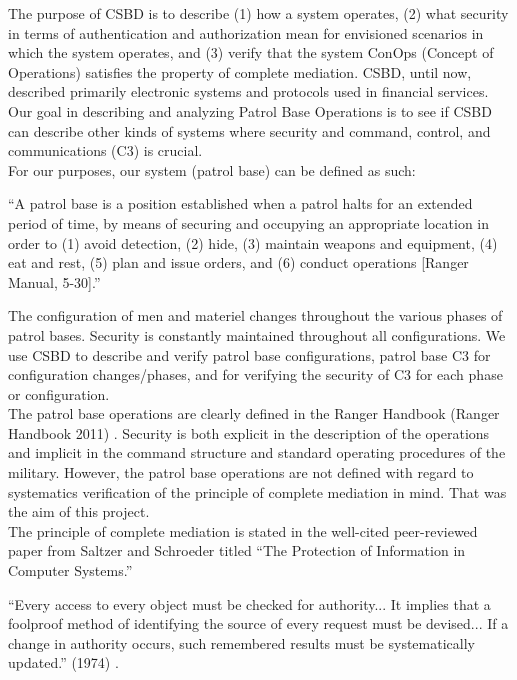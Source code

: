 
The purpose of CSBD is to describe (1) how a system operates, (2) what security in terms of authentication
and authorization mean for envisioned scenarios in which the system operates, and (3) verify that the system
ConOps (Concept of Operations) satisfies the property of complete mediation. CSBD, until now, described
primarily electronic systems and protocols used in financial services.  Our goal in describing and analyzing
Patrol Base Operations is to see if CSBD can describe other kinds of systems where security and command,
control, and communications (C3) is crucial.\\

For our purposes, our system (patrol base) can be defined as such:

\begin{displayquote}
  ``A patrol base is a position established when a patrol halts for an extended period of time, by means of securing
  and occupying an appropriate location in order to (1) avoid detection, (2) hide, (3) maintain weapons and equipment,
  (4) eat and rest, (5) plan and issue orders, and (6) conduct operations [Ranger Manual, 5-30].''
\end{displayquote}

The configuration of men and materiel changes throughout the various phases of patrol bases. Security is
constantly maintained throughout all configurations. We use CSBD to describe and verify patrol base configurations,
patrol base C3 for configuration changes/phases, and for verifying the security of C3 for each phase or configuration. \\ 

The patrol base operations are clearly defined in the Ranger Handbook (Ranger Handbook 2011) \cite{rangerhandbook} .  Security is both
explicit in the description of the operations and implicit in the command structure and standard operating procedures
of the military. However, the patrol base operations are not defined with regard to systematics verification of the
principle of complete mediation in mind.  That was the aim of this project.  \\

The principle of complete mediation is stated in the well-cited peer-reviewed paper from Saltzer and Schroeder titled
``The Protection of Information in Computer Systems.''

\begin{displayquote}
  ``Every access to every object must be checked for authority... It implies that a foolproof method of identifying the source of every request must be devised... If a change in authority occurs, such remembered results must be systematically updated.'' (1974) \cite{protectInfo} .
\end{displayquote}

